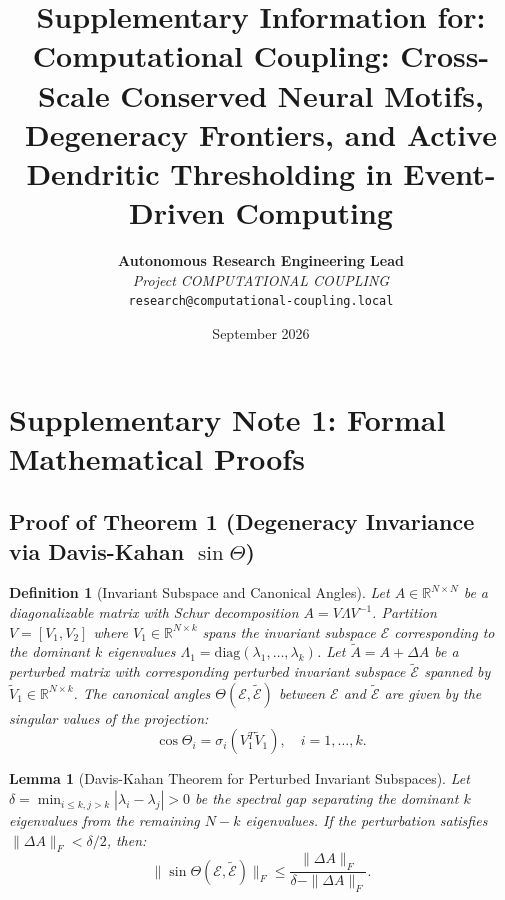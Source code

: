 \documentclass[10pt,letterpaper]{article}
\title{\textbf{Supplementary Information for:\\Computational Coupling: Cross-Scale Conserved Neural Motifs, Degeneracy Frontiers, and Active Dendritic Thresholding in Event-Driven Computing}}
\author{
  \textbf{Autonomous Research Engineering Lead}\\
  \textit{Project COMPUTATIONAL COUPLING}\\
  \texttt{research@computational-coupling.local}
}
\date{September 2026}
\newtheorem{lemma}{Lemma}
\newtheorem{definition}{Definition}
\begin{document}
\maketitle

\tableofcontents
\newpage

\section{Supplementary Note 1: Formal Mathematical Proofs}

\subsection{Proof of Theorem 1 (Degeneracy Invariance via Davis-Kahan $\sin\Theta$)}

\begin{definition}[Invariant Subspace and Canonical Angles]
Let $A \in \mathbb{R}^{N \times N}$ be a diagonalizable matrix with Schur decomposition $A = V \Lambda V^{-1}$. Partition $V = [V_1, V_2]$ where $V_1 \in \mathbb{R}^{N \times k}$ spans the invariant subspace $\mathcal{E}$ corresponding to the dominant $k$ eigenvalues $\Lambda_1 = \mathrm{diag}(\lambda_1, \dots, \lambda_k)$. Let $\tilde{A} = A + \Delta A$ be a perturbed matrix with corresponding perturbed invariant subspace $\tilde{\mathcal{E}}$ spanned by $\tilde{V}_1 \in \mathbb{R}^{N \times k}$. The canonical angles $\Theta(\mathcal{E}, \tilde{\mathcal{E}})$ between $\mathcal{E}$ and $\tilde{\mathcal{E}}$ are given by the singular values of the projection:
\begin{equation}
\cos\Theta_i = \sigma_i(V_1^T \tilde{V}_1), \quad i = 1, \dots, k.
\end{equation}
\end{definition}

\begin{lemma}[Davis-Kahan Theorem for Perturbed Invariant Subspaces]
Let $\delta = \min_{i \le k, j > k} |\lambda_i - \lambda_j| > 0$ be the spectral gap separating the dominant $k$ eigenvalues from the remaining $N - k$ eigenvalues. If the perturbation satisfies $\|\Delta A\|_F < \delta / 2$, then:
\begin{equation}
\|\sin\Theta(\mathcal{E}, \tilde{\mathcal{E}})\|_F \le \frac{\|\Delta A\|_F}{\delta - \|\Delta A\|_F}.
\end{equation}
\end{lemma}
\end{document}
